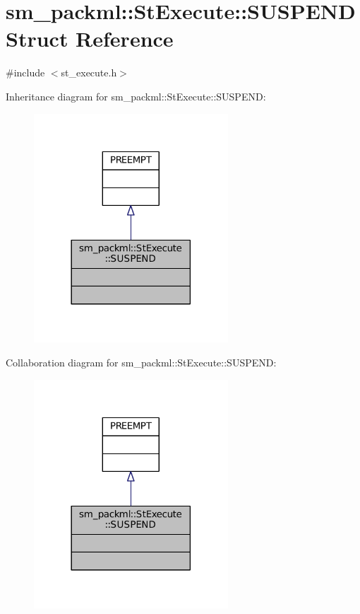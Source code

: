\hypertarget{structsm__packml_1_1StExecute_1_1SUSPEND}{}\section{sm\+\_\+packml\+:\+:St\+Execute\+:\+:S\+U\+S\+P\+E\+ND Struct Reference}
\label{structsm__packml_1_1StExecute_1_1SUSPEND}


{\ttfamily \#include $<$st\+\_\+execute.\+h$>$}



Inheritance diagram for sm\+\_\+packml\+:\+:St\+Execute\+:\+:S\+U\+S\+P\+E\+ND\+:
\nopagebreak
\begin{figure}[H]
\begin{center}
\leavevmode
\includegraphics[width=206pt]{structsm__packml_1_1StExecute_1_1SUSPEND__inherit__graph}
\end{center}
\end{figure}


Collaboration diagram for sm\+\_\+packml\+:\+:St\+Execute\+:\+:S\+U\+S\+P\+E\+ND\+:
\nopagebreak
\begin{figure}[H]
\begin{center}
\leavevmode
\includegraphics[width=206pt]{structsm__packml_1_1StExecute_1_1SUSPEND__coll__graph}
\end{center}
\end{figure}



